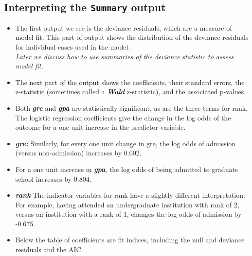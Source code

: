 \documentclass[]{article}
\begin{document}
\subsection{Interpreting the \texttt{Summary} output}
\begin{itemize}
\item The first output we see is the deviance residuals, which are a measure of model fit. This part of output shows the distribution of the deviance residuals for individual cases used in the model. \\ \textit{Later we discuss how to use summaries of the deviance statistic to assess model fit.}
\item The next part of the output shows the coefficients, their standard errors, the z-statistic (sometimes called a \textbf{\textit{Wald} }z-statistic), and the associated p-values. 
\item
Both \textbf{\textit{gre}} and \textbf{\textit{gpa}} are statistically significant, as are the three terms for rank. The logistic regression coefficients give the change in the log odds of the outcome for a one unit increase in the predictor variable.
\item \textbf{\textit{gre:}} Similarly, for every one unit change in gre, the log odds of admission (versus non-admission) increases by 0.002.
\item 
For a one unit increase in \textbf{\textit{gpa}}, the log odds of being admitted to graduate school increases by 0.804.
\item \textbf{\textit{rank}}
The indicator variables for rank have a slightly different interpretation. For example, having attended an undergraduate institution with rank of 2, versus an institution with a rank of 1, changes the log odds of admission by -0.675.
\item Below the table of coefficients are fit indices, including the null and deviance residuals and the AIC.
\end{itemize}
\end{document}
